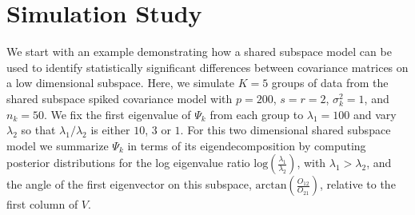 \documentclass[12pt]{article}
\newcommand{\etr}{\text{etr}}
\begin{document}





\section{Simulation Study}
\label{sec:simulation}


We start with an example demonstrating how a shared subspace
model can be used to identify statistically significant differences between
covariance matrices on a low dimensional subspace. Here, we simulate
$K=5$ groups of data from the shared subspace spiked covariance
model with $p=200$, $s=r=2$, $\sigma_k^2=1$, and
$n_k=50$.  We fix the first eigenvalue of $\Psi_k$ from each group to
$\lambda_1=100$ and vary $\lambda_2$ so that $\lambda_1/\lambda_2$ is
either $10$, $3$ or $1$.  For this two dimensional shared subspace
model we summarize $\Psi_k$ in terms of its eigendecomposition by
computing posterior distributions for the log eigenvalue ratio
$\text{log}(\frac{\lambda_1}{\lambda_2})$, with $\lambda_1 > \lambda_2$, and the
angle of the first eigenvector on this subspace,
$\text{arctan}(\frac{O_{12}}{O_{21}})$, relative to the first column
of $V$.
\end{document}
